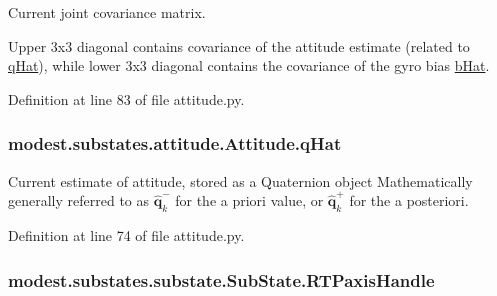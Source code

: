 Current joint covariance matrix. 

Upper 3x3 diagonal contains covariance of the attitude estimate (related to \hyperlink{classmodest_1_1substates_1_1attitude_1_1Attitude_a22a550534d908153baef2e52f7142c5e}{q\+Hat}), while lower 3x3 diagonal contains the covariance of the gyro bias \hyperlink{classmodest_1_1substates_1_1attitude_1_1Attitude_aac0bc92dc53893d2f190c1252690053c}{b\+Hat}. 

Definition at line 83 of file attitude.\+py.

\subsubsection[{\texorpdfstring{q\+Hat}{qHat}}]{\setlength{\rightskip}{0pt plus 5cm}modest.\+substates.\+attitude.\+Attitude.\+q\+Hat}\hypertarget{classmodest_1_1substates_1_1attitude_1_1Attitude_a22a550534d908153baef2e52f7142c5e}{}\label{classmodest_1_1substates_1_1attitude_1_1Attitude_a22a550534d908153baef2e52f7142c5e}


Current estimate of attitude, stored as a Quaternion object Mathematically generally referred to as $\mathbf{\hat{q}}^{-}_{k}$ for the a priori value, or $\mathbf{\hat{q}}^{+}_{k}$ for the a posteriori. 



Definition at line 74 of file attitude.\+py.

\subsubsection[{\texorpdfstring{R\+T\+Paxis\+Handle}{RTPaxisHandle}}]{\setlength{\rightskip}{0pt plus 5cm}modest.\+substates.\+substate.\+Sub\+State.\+R\+T\+Paxis\+Handle\hspace{0.3cm}{\ttfamily [inherited]}}\hypertarget{classmodest_1_1substates_1_1substate_1_1SubState_a497ccbb6658589b02568e87c6382222e}{}\label{classmodest_1_1substates_1_1substate_1_1SubState_a497ccbb6658589b02568e87c6382222e}


